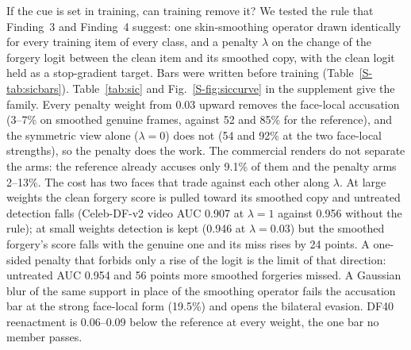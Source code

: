 \documentclass[conference]{IEEEtran}
\begin{document}
If the cue is set in training, can training remove it? We tested the rule that Finding~3 and Finding~4 suggest: one
skin-smoothing operator drawn identically for every training item of every class, and a penalty $\lambda$ on the change of
the forgery logit between the clean item and its smoothed copy, with the clean logit held as a stop-gradient target. Bars
were written before training (Table~\ref{S-tab:sicbars}). Table~\ref{tab:sic} and Fig.~\ref{S-fig:siccurve} in the supplement give the family. Every penalty
weight from 0.03 upward removes the face-local accusation (3--7\% on smoothed genuine frames, against 52 and 85\% for the
reference), and the symmetric view alone ($\lambda=0$) does not (54 and 92\% at the two face-local strengths), so the
penalty does the work. The commercial renders do not separate the arms: the reference already accuses only 9.1\% of them
and the penalty arms 2--13\%.
The cost has two faces that trade against each other along $\lambda$. At large weights the clean forgery score is pulled
toward its smoothed copy and untreated detection falls (Celeb-DF-v2 video AUC 0.907 at $\lambda=1$ against 0.956 without
the rule); at small weights detection is kept (0.946 at $\lambda=0.03$) but the smoothed forgery's score falls with the
genuine one and its miss rises by 24 points. A one-sided penalty that forbids only a rise of the logit is the limit of that
direction: untreated AUC 0.954 and 56 points more smoothed forgeries missed. A Gaussian blur of the same support in place of
the smoothing operator fails the accusation bar at the strong face-local form (19.5\%) and opens the bilateral evasion. DF40
reenactment is 0.06--0.09 below the reference at every weight, the one bar no member passes.
\end{document}
